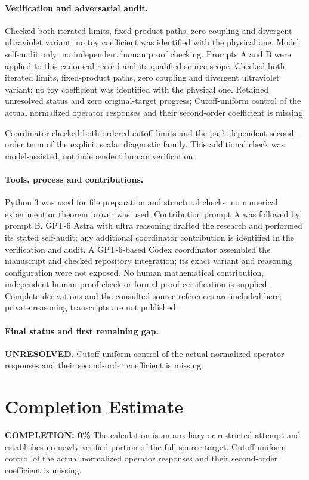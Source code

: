 \documentclass[11pt]{article}
\begin{document}
\paragraph{Verification and adversarial audit.}
Checked both iterated limits, fixed-product paths, zero coupling and divergent ultraviolet variant; no toy coefficient was identified with the physical one. Model self-audit only; no independent human proof checking. Prompts A and B were applied to this canonical record and its qualified source scope. Checked both iterated limits, fixed-product paths, zero coupling and divergent ultraviolet variant; no toy coefficient was identified with the physical one. Retained unresolved status and zero original-target progress; Cutoff-uniform control of the actual normalized operator responses and their second-order coefficient is missing.

Coordinator checked both ordered cutoff limits and the path-dependent second-order term of the explicit scalar diagnostic family. This additional check was model-assisted, not independent human verification.

\paragraph{Tools, process and contributions.}
Python 3 was used for file preparation and structural checks; no numerical experiment or theorem prover was used. Contribution prompt A was followed by prompt B. GPT-6 Astra with ultra reasoning drafted the research and performed its stated self-audit; any additional coordinator contribution is identified in the verification and audit. A GPT-6-based Codex coordinator assembled the manuscript and checked repository integration; its exact variant and reasoning configuration were not exposed. No human mathematical contribution, independent human proof check or formal proof certification is supplied. Complete derivations and the consulted source references are included here; private reasoning transcripts are not published.

\paragraph{Final status and first remaining gap.}
\textbf{UNRESOLVED}. Cutoff-uniform control of the actual normalized operator responses and their second-order coefficient is missing.

\section{Completion Estimate}
\noindent\textbf{COMPLETION: 0\%}
The calculation is an auxiliary or restricted attempt and establishes no newly verified portion of the full source target. Cutoff-uniform control of the actual normalized operator responses and their second-order coefficient is missing.
\end{document}
